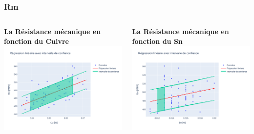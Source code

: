 \documentclass[aspectratio=169]{beamer}
\begin{document}
\begin{frame}
\frametitle{Rm}
\begin{columns}[t]
  \begin{column}{0.5\textwidth}
    \centering
    \textbf{La Résistance mécanique en fonction du Cuivre} \\
    \includegraphics[width=\textwidth]{Figures/Regression_Cu_Rm.pdf} 
  \end{column}
  \begin{column}{0.5\textwidth}
    \centering
    \textbf{La Résistance mécanique en fonction du Sn} \\
    \includegraphics[width=\textwidth]{Figures/Regression_Sn_Rm.pdf} 
  \end{column}
\end{columns}
\end{frame}
\end{document}
